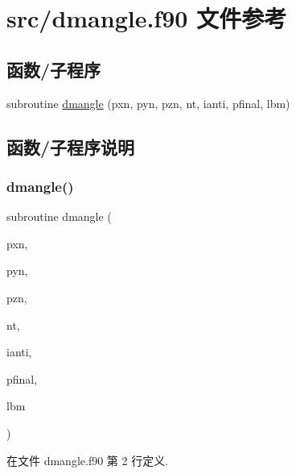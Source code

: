 \hypertarget{dmangle_8f90}{}\section{src/dmangle.f90 文件参考}
\label{dmangle_8f90}
\subsection*{函数/子程序}
\begin{DoxyCompactItemize}
\item 
subroutine \mbox{\hyperlink{dmangle_8f90_af88cf6281aed01c87573b14561e2dcb6}{dmangle}} (pxn, pyn, pzn, nt, ianti, pfinal, lbm)
\end{DoxyCompactItemize}


\subsection{函数/子程序说明}
\mbox{\label{dmangle_8f90_af88cf6281aed01c87573b14561e2dcb6}} 
\subsubsection{\texorpdfstring{dmangle()}{dmangle()}}
{\footnotesize\ttfamily subroutine dmangle (\begin{DoxyParamCaption}\item[{}]{pxn,  }\item[{}]{pyn,  }\item[{}]{pzn,  }\item[{}]{nt,  }\item[{}]{ianti,  }\item[{}]{pfinal,  }\item[{}]{lbm }\end{DoxyParamCaption})}



在文件 dmangle.\+f90 第 2 行定义.

